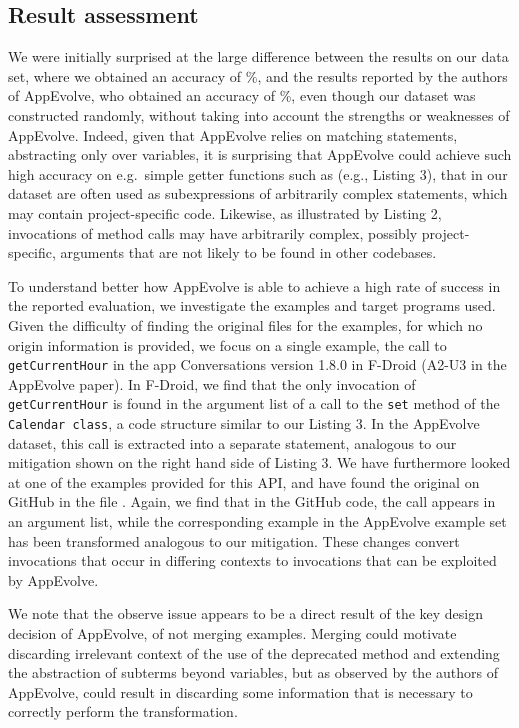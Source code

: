 \subsection{Result assessment}

We were initially surprised at the large difference between the results on
our data set, where we obtained an accuracy  of
\%, and the results reported by the authors of AppEvolve, who
obtained an accuracy of \%, even though our dataset was
constructed randomly, without taking into account the strengths or
weaknesses of AppEvolve.  Indeed, given that AppEvolve relies on matching
statements, abstracting only over variables, it is surprising that
AppEvolve could achieve such high accuracy on e.g.\ simple getter functions such
as  (e.g., Listing 3), that in our dataset are often
used as subexpressions of arbitrarily complex statements, which may contain
project-specific code.  Likewise, as illustrated by Listing 2, invocations
of method calls may have arbitrarily complex, possibly project-specific,
arguments that are not likely to be found in other codebases.

To understand better how AppEvolve is able to achieve a high rate of
success in the reported evaluation, we investigate the examples and target
programs used.  Given the difficulty of finding the original files for the
examples, for which no origin information is provided, we focus on a single
example, the call to {\tt getCurrentHour} in the app {\sc Conversations}
version 1.8.0 in F-Droid (A2-U3 in the AppEvolve paper).  In F-Droid, we
find that the only invocation of {\tt getCurrentHour} is found in the
argument list of a call to the {\tt set} method of the {\tt Calendar
  class}, a code structure similar to our Listing 3.  In the AppEvolve
dataset, this call is extracted into a separate statement, analogous to our
mitigation shown on the right hand side of Listing 3.  We have furthermore
looked at one of the examples provided for this API, and have found the
original on GitHub in the file .  Again, we find that in the
GitHub code, the call appears in an argument list, while the corresponding
example in the AppEvolve example set has been transformed analogous to our
mitigation.  These changes convert invocations that occur in differing
contexts to invocations that can be exploited by AppEvolve.

We note that the observe issue appears to be a direct result of the key
design decision of AppEvolve, of not merging examples.  Merging could
motivate discarding irrelevant context of the use of the deprecated method
and extending the abstraction of subterms beyond variables, but as observed
by the authors of AppEvolve, could result in discarding some information
that is necessary to correctly perform the transformation.

